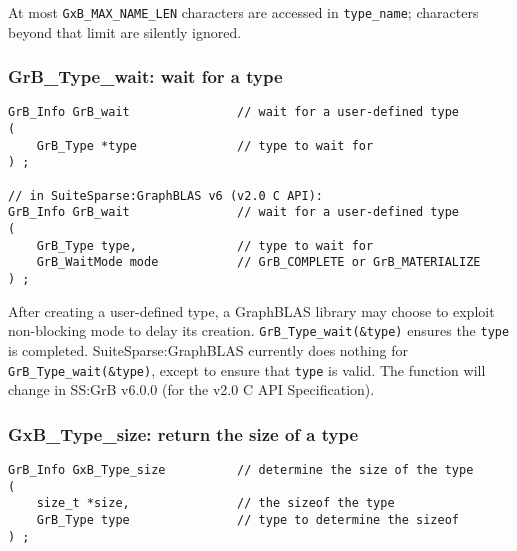 \documentclass[12pt]{article}
\begin{document}
At most \verb'GxB_MAX_NAME_LEN' characters are accessed in \verb'type_name';
characters beyond that limit are silently ignored.

\subsubsection{{\sf GrB\_Type\_wait:} wait for a type}

\begin{mdframed}[userdefinedwidth=6in]
{\footnotesize
\begin{verbatim}
GrB_Info GrB_wait               // wait for a user-defined type
(
    GrB_Type *type              // type to wait for
) ;

// in SuiteSparse:GraphBLAS v6 (v2.0 C API):
GrB_Info GrB_wait               // wait for a user-defined type
(
    GrB_Type type,              // type to wait for
    GrB_WaitMode mode           // GrB_COMPLETE or GrB_MATERIALIZE
) ;

\end{verbatim}
}\end{mdframed}

After creating a user-defined type, a GraphBLAS library may choose to exploit
non-blocking mode to delay its creation.  \verb'GrB_Type_wait(&type)' ensures
the \verb'type' is completed.  SuiteSparse:GraphBLAS currently does nothing for
\verb'GrB_Type_wait(&type)', except to ensure that \verb'type' is valid.
The function will change in SS:GrB v6.0.0 (for the v2.0 C API Specification).

\newpage
\subsubsection{{\sf GxB\_Type\_size:} return the size of a type}

\begin{mdframed}[userdefinedwidth=6in]
{\footnotesize
\begin{verbatim}
GrB_Info GxB_Type_size          // determine the size of the type
(
    size_t *size,               // the sizeof the type
    GrB_Type type               // type to determine the sizeof
) ;
\end{verbatim}
}\end{mdframed}
\end{document}
